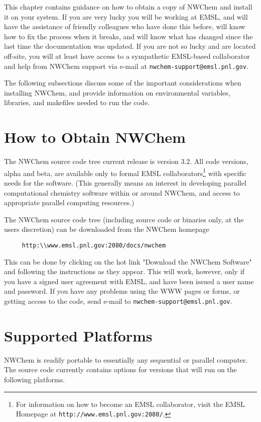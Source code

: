 \label{sec:install}

This chapter contains guidance on how to obtain a copy of NWChem and
install it on your system.  If you are very lucky you will be working
at EMSL, and will have the assistance of friendly colleagues who have
done this before, will know how to fix the process when it breaks,
and will know what has changed since the last time the documentation
was updated.
If you are not so lucky and are located off-site, you will at least have
access to a sympathetic EMSL-based collaborator and help from NWChem 
support via e-mail at {\tt nwchem-support@emsl.pnl.gov}.

The following subsections discuss some of the important considerations
when installing NWChem, and provide information on environmental
variables, libraries, and makefiles needed to run the code.

\section{How to Obtain NWChem}

The NWChem source code tree current release is version 3.2.  All code versions, alpha and
beta, are available only to formal EMSL collaborators\footnote{For information on
how to become an EMSL collaborator, visit the EMSL Homepage at 
\verb+http://www.emsl.pnl.gov:2080/+.} with specific
needs for the software.  (This generally means an interest in developing
parallel computational chemistry software within or around NWChem, and
access to appropriate parallel computing resources.)

The NWChem source code tree (including source code or binaries only, at the
users discretion) can be downloaded from the NWChem homepage 

\begin{verbatim}
     http:\\www.emsl.pnl.gov:2080/docs/nwchem
\end{verbatim}

This can be done by clicking on the hot link "Download the NWChem Software" and following the
instructions as they appear.  This will work, however, only if you have
a signed user agreement
with EMSL, and have been issued a user name and password.  If you have any problems
using the WWW pages or forms, or getting access to the code, send e-mail to
{\tt nwchem-support@emsl.pnl.gov}.

\section{Supported Platforms}
\label{sec:platforms}
NWChem is readily portable to essentially any sequential or parallel computer.  
The source code currently contains options for versions that will run
on the following platforms.

